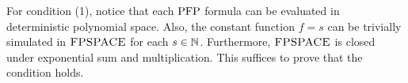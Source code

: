 For condition (1), notice that each ${\rm PFP}$ formula can be evaluated in deterministic polynomial space. Also, the constant function $f = s$ can be trivially simulated in $\text{\sc FPSPACE}$ for each $s\in\mathbb{N}$. Furthermore, $\text{\sc FPSPACE}$ is closed under exponential sum and multiplication. This suffices to prove that the condition holds.


